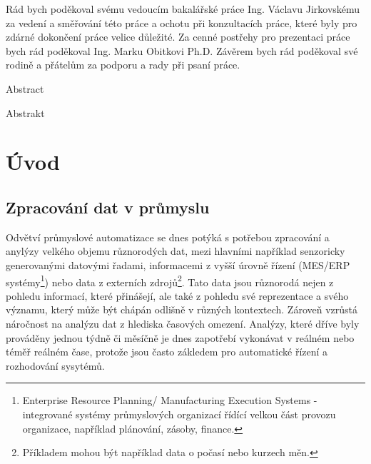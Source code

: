 \documentclass[11pt,twoside,a4paper]{book}
\begin{document}
	
	\translate				%
	

	\coverpagestarts

	\acknowledgements
	\noindent
	Rád bych poděkoval svému vedoucím bakalářské práce Ing. Václavu Jirkovskému za vedení a směřování této práce a ochotu při konzultacích práce, které byly pro zdárné dokončení práce velice důležité. Za cenné postřehy pro prezentaci práce bych rád poděkoval Ing. Marku Obitkovi Ph.D. Závěrem bych rád poděkoval své rodině a přátelům za podporu a rady při psaní práce.





	\abstractpage

	Abstract


	\baselineskip

	Abstrakt

	\tableofcontents		

	\listoffigures			

	\mainbodystarts

\chapter{Úvod} 
	\section{Zpracování dat v průmyslu}
		Odvětví průmyslové automatizace se dnes potýká s potřebou zpracování a anylýzy velkého objemu různorodých dat, mezi hlavními například senzoricky generovanými datovými řadami, informacemi z vyšší úrovně řízení (MES/ERP systémy\footnote{Enterprise Resource Planning/ Manufacturing Execution Systems - integrované systémy průmyslových organizací řídící velkou část provozu organizace, například plánování, zásoby, finance.}) nebo data z externích zdrojů\footnote{Příkladem mohou být například data o počasí nebo kurzech měn.}. Tato data jsou různorodá nejen z pohledu informací, které přinášejí, ale také z pohledu své reprezentace a svého významu, který může být chápán odlišně v různých kontextech. Zároveň vzrůstá náročnost na analýzu dat z hlediska časových omezení. Analýzy, které dříve byly prováděny jednou týdně či měsíčně je dnes zapotřebí vykonávat v reálném nebo téměř reálném čase, protože jsou často zákledem pro automatické řízení a rozhodování sysytémů.
\end{document}
